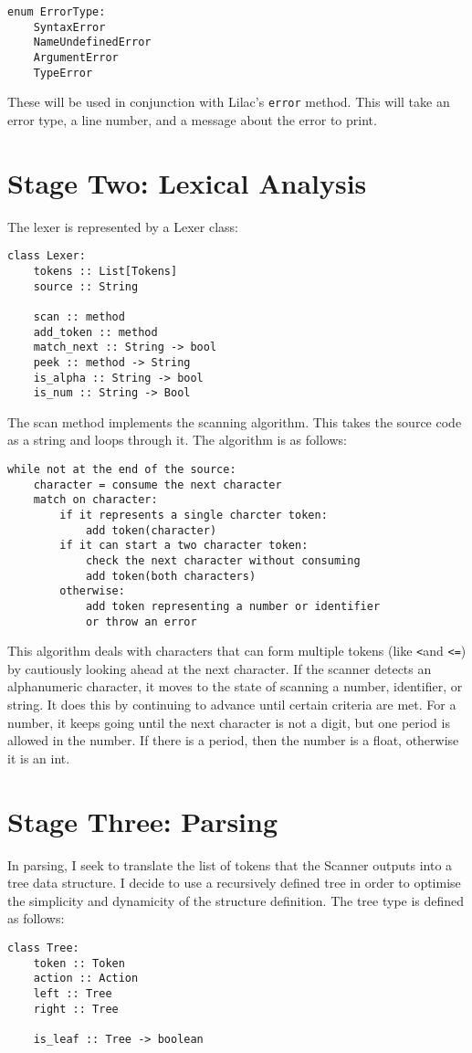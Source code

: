 \documentclass[a4paper, 11pt]{report}
\begin{document}
\begin{verbatim}
enum ErrorType:
	SyntaxError
	NameUndefinedError
	ArgumentError
	TypeError
\end{verbatim}

These will be used in conjunction with Lilac's \verb|error| method. This will take an error type, a line number, and a message about the error to print. 

\section{Stage Two: Lexical Analysis}\label{sec:stage-two-lexical-analysis}
The lexer is represented by a Lexer class:

\begin{verbatim}
class Lexer:
    tokens :: List[Tokens]
    source :: String

    scan :: method
    add_token :: method
    match_next :: String -> bool
    peek :: method -> String
    is_alpha :: String -> bool
    is_num :: String -> Bool
\end{verbatim}

The scan method implements the scanning algorithm. This takes the source code as a string and loops through it. The algorithm is as follows:
\begin{verbatim}
while not at the end of the source:
    character = consume the next character
    match on character:
        if it represents a single charcter token:
            add token(character)
        if it can start a two character token:
            check the next character without consuming
            add token(both characters)
        otherwise:
            add token representing a number or identifier
            or throw an error
\end{verbatim}
This algorithm deals with characters that can form multiple tokens (like \verb|<|and \verb|<=|) by cautiously looking ahead at the next character. If the scanner detects an alphanumeric character, it moves to the state of scanning a number, identifier, or string. It does this by continuing to advance until certain criteria are met. For a number, it keeps going until the next character is not a digit, but one period is allowed in the number. If there is a period, then the number is a float, otherwise it is an int.

\section{Stage Three: Parsing}\label{sec:stage-three-parsing}
In parsing, I seek to translate the list of tokens that the Scanner outputs into a tree data structure. I decide to use a recursively defined tree in order to optimise the simplicity and dynamicity of the structure definition. The tree type is defined as follows:\\
\begin{verbatim}
class Tree:
	token :: Token
	action :: Action
	left :: Tree
	right :: Tree

	is_leaf :: Tree -> boolean
\end{verbatim}
\end{document}
